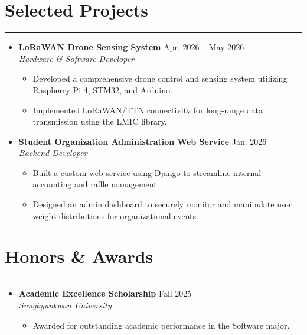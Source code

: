 \documentclass[letterpaper, 10pt]{article}
\begin{document}
\section*{Selected Projects}
\hrule
\vspace{4pt}
\begin{itemize}
    \item \textbf{LoRaWAN Drone Sensing System} \hfill Apr. 2026 -- May 2026 \\
    \textit{Hardware \& Software Developer}
    \begin{itemize}
        \item Developed a comprehensive drone control and sensing system utilizing Raspberry Pi 4, STM32, and Arduino.
        \item Implemented LoRaWAN/TTN connectivity for long-range data transmission using the LMIC library.
    \end{itemize}
    
    \item \textbf{Student Organization Administration Web Service} \hfill Jan. 2026 \\
    \textit{Backend Developer}
    \begin{itemize}
        \item Built a custom web service using Django to streamline internal accounting and raffle management.
        \item Designed an admin dashboard to securely monitor and manipulate user weight distributions for organizational events.
    \end{itemize}
\end{itemize}

\section*{Honors \& Awards}
\hrule
\vspace{4pt}
\begin{itemize}
    \item \textbf{Academic Excellence Scholarship} \hfill Fall 2025 \\
    \textit{Sungkyunkwan University}
    \begin{itemize}
        \item Awarded for outstanding academic performance in the Software major.
    \end{itemize}
\end{itemize}
\end{document}
